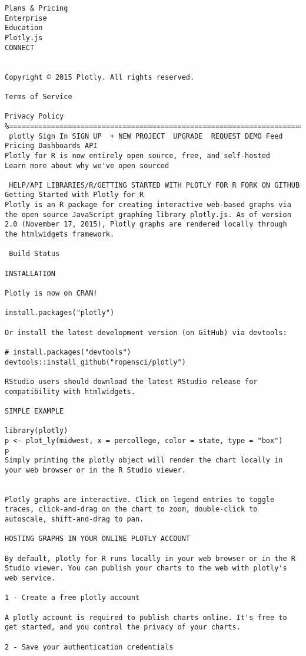 \begin{framed}
\begin{verbatim}
Plans & Pricing
Enterprise
Education
Plotly.js
CONNECT

    
Copyright © 2015 Plotly. All rights reserved.

Terms of Service

Privacy Policy
%=======================================================================%
 plotly Sign In SIGN UP  + NEW PROJECT  UPGRADE  REQUEST DEMO Feed Pricing Dashboards API
Plotly for R is now entirely open source, free, and self-hosted
Learn more about why we've open sourced

 HELP/API LIBRARIES/R/GETTING STARTED WITH PLOTLY FOR R FORK ON GITHUB
Getting Started with Plotly for R
Plotly is an R package for creating interactive web-based graphs via the open source JavaScript graphing library plotly.js. As of version 2.0 (November 17, 2015), Plotly graphs are rendered locally through the htmlwidgets framework.

 Build Status

INSTALLATION

Plotly is now on CRAN!

install.packages("plotly")

Or install the latest development version (on GitHub) via devtools:

# install.packages("devtools")
devtools::install_github("ropensci/plotly")

RStudio users should download the latest RStudio release for compatibility with htmlwidgets.

SIMPLE EXAMPLE

library(plotly)
p <- plot_ly(midwest, x = percollege, color = state, type = "box")
p
Simply printing the plotly object will render the chart locally in your web browser or in the R Studio viewer.


Plotly graphs are interactive. Click on legend entries to toggle traces, click-and-drag on the chart to zoom, double-click to autoscale, shift-and-drag to pan.

HOSTING GRAPHS IN YOUR ONLINE PLOTLY ACCOUNT

By default, plotly for R runs locally in your web browser or in the R Studio viewer. You can publish your charts to the web with plotly's web service.

1 - Create a free plotly account

A plotly account is required to publish charts online. It's free to get started, and you control the privacy of your charts.

2 - Save your authentication credentials


\end{verbatim}
\end{framed}
